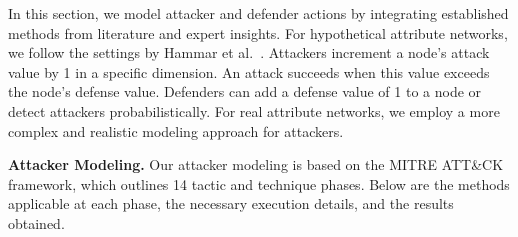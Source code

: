 
In this section, we model attacker and defender actions by integrating established methods from literature and expert insights.
For hypothetical attribute networks, we follow the settings by Hammar et al.~\cite{2020Finding}. Attackers increment a node's attack value by 1 in a specific dimension. An attack succeeds when this value exceeds the node's defense value. Defenders can add a defense value of 1 to a node or detect attackers probabilistically. For real attribute networks, we employ a more complex and realistic modeling approach for attackers.




\textbf{Attacker Modeling.}
Our attacker modeling is based on the MITRE ATT\&CK framework, which outlines 14 tactic and technique phases.
Below are the methods applicable at each phase, the necessary execution details, and the results obtained.


